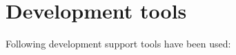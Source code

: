 \documentclass[a4paper,12pt]{report}
\begin{document}







\section{Development tools}
Following development support tools have been used:
\end{document}
